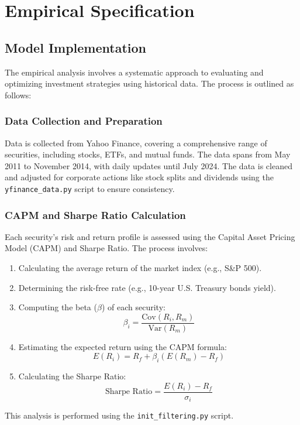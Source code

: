 \section{Empirical Specification}

\subsection{Model Implementation}
The empirical analysis involves a systematic approach to evaluating and optimizing investment strategies using historical data. The process is outlined as follows:

\subsubsection{Data Collection and Preparation}
Data is collected from Yahoo Finance, covering a comprehensive range of securities, including stocks, ETFs, and mutual funds. The data spans from May 2011 to November 2014, with daily updates until July 2024. The data is cleaned and adjusted for corporate actions like stock splits and dividends using the \texttt{yfinance\_data.py} script to ensure consistency.

\subsubsection{CAPM and Sharpe Ratio Calculation}
Each security's risk and return profile is assessed using the Capital Asset Pricing Model (CAPM) and Sharpe Ratio. The process involves:
\begin{enumerate}
    \item Calculating the average return of the market index (e.g., S\&P 500).
    \item Determining the risk-free rate (e.g., 10-year U.S. Treasury bonds yield).
    \item Computing the beta (\(\beta\)) of each security:
    \begin{equation}
        \beta_i = \frac{\text{Cov}(R_i, R_m)}{\text{Var}(R_m)}
    \end{equation}
    \item Estimating the expected return using the CAPM formula:
    \begin{equation}
        E(R_i) = R_f + \beta_i (E(R_m) - R_f)
    \end{equation}
    \item Calculating the Sharpe Ratio:
    \begin{equation}
        \text{Sharpe Ratio} = \frac{E(R_i) - R_f}{\sigma_i}
    \end{equation}
\end{enumerate}
This analysis is performed using the \texttt{init\_filtering.py} script.

